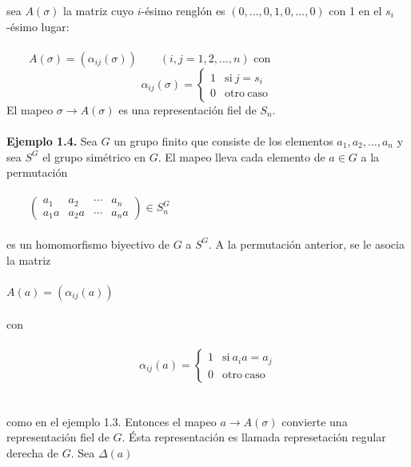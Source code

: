 \documentclass[12pt]{book}
\theoremstyle{definition}
\newcounter{in}
\newcounter{ini}
\begin{document}
sea $A\left(\sigma\right)$ la matriz cuyo $i$-ésimo renglón es $\left(0,...,0,1,0,...,0\right)$ con 1 en el $s_{i}$-ésimo lugar:\\~\\
$\qquad
A\left(\sigma\right) = \left(\alpha_{ij}\left(\sigma\right)\right) 
\qquad
\left(i,j=1,2,...,n\right)
$
con
\begin{equation*}
         \alpha_{ij}\left(\sigma\right) = \left\{
	       \begin{array}{ll}
		 1      & \mathrm{si\ } j = s_{i} \\
		 0      & \mathrm{otro\ caso\ } 
	       \end{array}
	     \right.
\end{equation*}
El mapeo $\sigma \rightarrow A\left(\sigma\right)$ es una representación fiel de $S_{n}$.\\~\\
\textbf{Ejemplo 1.4.} Sea $G$ un grupo finito que consiste de los elementos $a_{1},a_{2},...,a_{n}$  y sea $S^{G}$ el grupo simétrico en $G$. El mapeo lleva cada elemento de $a \in G$ a la permutación\\~\\
$\qquad 
\begin{pmatrix}
a_{1} & a_{2} & \cdots  & a_{n}\\ 
a_{1}a & a_{2}a & \cdots & a_{n}a
\end{pmatrix} 
\in S_{n}^{G}$\\~\\
es un homomorfismo biyectivo de $G$ a $S^{G}$. A la permutación anterior, se le asocia la matriz\\~\\
$A\left(a\right)=\left(\alpha_{ij}\left(a\right)\right)$\\~\\
con\\~\\
\begin{equation*}
         \alpha_{ij}\left(a\right) = \left\{
	       \begin{array}{ll}
		 1      & \mathrm{si\ } a_{i}a = a_{j} \\
		 0      & \mathrm{otro\ caso\ } 
	       \end{array}
	     \right.
\end{equation*}
\\~\\
como en el ejemplo 1.3. Entonces el mapeo $a \rightarrow A\left(\sigma\right)$ convierte una representación fiel de $G$. Ésta representación es llamada represetación regular derecha de $G$. Sea $\Delta\left(a\right)$\\~\\
\end{document}
